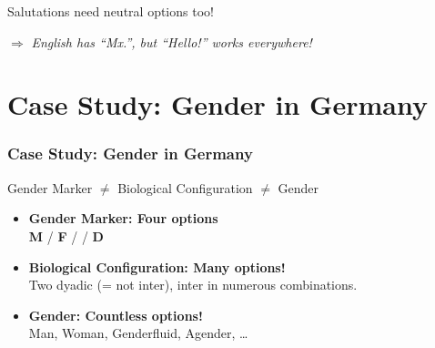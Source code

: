 \documentclass[aspectratio=169,x11names]{beamer}
\begin{document}
\begin{frame}
\begin{center}
\huge
Salutations need neutral options too!
\medskip

\Large
$\Rightarrow$ \emph{English has ``Mx.'', but ``Hello!'' works everywhere!}
\end{center}
\end{frame}

\section*{Case Study: Gender in Germany}

\begin{frame}
\frametitle{Case Study: Gender in Germany}

\begin{center}
Gender Marker \hfill $\neq$ \hfill Biological Configuration \hfill $\neq$ \hfill Gender \hspace*{30px}
\end{center}
\bigskip

\begin{itemize}
\item \textbf{Gender Marker: Four options}\\
\textbf{M} / \textbf{F} / \;\; / \textbf{D}\medskip

\item \textbf{Biological Configuration: Many options!}\\
Two dyadic (= not inter), inter in numerous combinations.
\medskip

\item \textbf{Gender: Countless options!}\\
Man, Woman, Genderfluid, Agender, \dots 
\end{itemize}

\end{frame}
\end{document}
